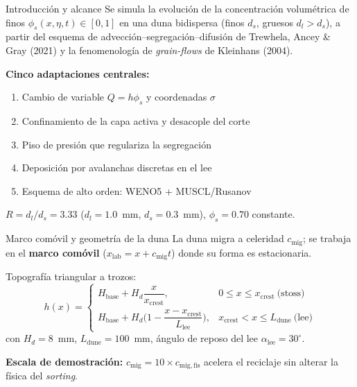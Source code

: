 \documentclass[11pt]{beamer}
\begin{document}
\begin{frame}{Introducción y alcance}
Se simula la evolución de la concentración volumétrica de finos $\phi_s(x,\eta,t)\in[0,1]$ en una duna bidispersa (finos $d_s$, gruesos $d_l>d_s$), a partir del esquema de advección--segregación--difusión de Trewhela, Ancey \& Gray (2021) y la fenomenología de \emph{grain-flows} de Kleinhans (2004).

\vspace{6pt}
\textbf{Cinco adaptaciones centrales:}
\begin{enumerate}
  \item Cambio de variable $Q=h\phi_s$ y coordenadas $\sigma$
  \item Confinamiento de la capa activa y desacople del corte
  \item Piso de presión que regulariza la segregación
  \item Deposición por avalanchas discretas en el lee
  \item Esquema de alto orden: WENO5 + MUSCL/Rusanov
\end{enumerate}

\vspace{4pt}
$R = d_l/d_s = 3.33$ ($d_l=1.0$~mm, $d_s=0.3$~mm), $\phi_s=0.70$ constante.
\end{frame}

\begin{frame}{Marco comóvil y geometría de la duna}
La duna migra a celeridad $c_{\mathrm{mig}}$; se trabaja en el \textbf{marco comóvil} ($x_{\mathrm{lab}}=x+c_{\mathrm{mig}}t$) donde su forma es estacionaria.

\vspace{4pt}
Topografía triangular a trozos:
\begin{equation*}
    h(x) = \begin{cases}
        H_{\mathrm{base}} + H_d\dfrac{x}{x_{\mathrm{crest}}}, & 0\le x \le x_{\mathrm{crest}} \ \text{(stoss)}\\[8pt]
        H_{\mathrm{base}} + H_d\Big(1-\dfrac{x-x_{\mathrm{crest}}}{L_{\mathrm{lee}}}\Big), & x_{\mathrm{crest}}<x\le L_{\mathrm{dune}} \ \text{(lee)}
    \end{cases}
\end{equation*}
con $H_d=8$~mm, $L_{\mathrm{dune}}=100$~mm, ángulo de reposo del lee $\alpha_{\mathrm{lee}}=30^\circ$.

\vspace{6pt}
\textbf{Escala de demostración:} $c_{\mathrm{mig}}=10\times c_{\mathrm{mig,fis}}$ acelera el reciclaje sin alterar la física del \emph{sorting}.
\end{frame}
\end{document}
